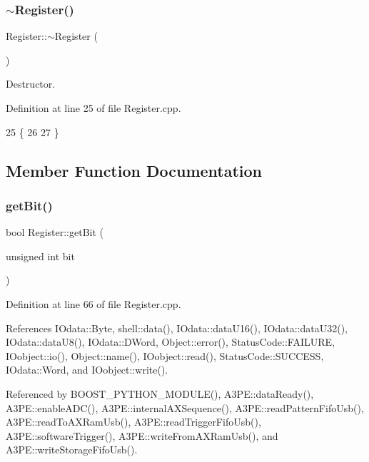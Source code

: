 \subsubsection{\texorpdfstring{$\sim$\+Register()}{~Register()}}
{\footnotesize\ttfamily Register\+::$\sim$\+Register (\begin{DoxyParamCaption}{ }\end{DoxyParamCaption})\hspace{0.3cm}{\ttfamily [virtual]}}



Destructor. 



Definition at line 25 of file Register.\+cpp.


\begin{DoxyCode}
25                     \{
26 
27 \}
\end{DoxyCode}


\subsection{Member Function Documentation}
\mbox{\label{classRegister_a5d27c9ff548817eee097ba4fdc8e8f69}} 
\subsubsection{\texorpdfstring{get\+Bit()}{getBit()}}
{\footnotesize\ttfamily bool Register\+::get\+Bit (\begin{DoxyParamCaption}\item[{unsigned int}]{bit }\end{DoxyParamCaption})}



Definition at line 66 of file Register.\+cpp.



References I\+Odata\+::\+Byte, shell\+::data(), I\+Odata\+::data\+U16(), I\+Odata\+::data\+U32(), I\+Odata\+::data\+U8(), I\+Odata\+::\+D\+Word, Object\+::error(), Status\+Code\+::\+F\+A\+I\+L\+U\+RE, I\+Oobject\+::io(), Object\+::name(), I\+Oobject\+::read(), Status\+Code\+::\+S\+U\+C\+C\+E\+SS, I\+Odata\+::\+Word, and I\+Oobject\+::write().



Referenced by B\+O\+O\+S\+T\+\_\+\+P\+Y\+T\+H\+O\+N\+\_\+\+M\+O\+D\+U\+L\+E(), A3\+P\+E\+::data\+Ready(), A3\+P\+E\+::enable\+A\+D\+C(), A3\+P\+E\+::internal\+A\+X\+Sequence(), A3\+P\+E\+::read\+Pattern\+Fifo\+Usb(), A3\+P\+E\+::read\+To\+A\+X\+Ram\+Usb(), A3\+P\+E\+::read\+Trigger\+Fifo\+Usb(), A3\+P\+E\+::software\+Trigger(), A3\+P\+E\+::write\+From\+A\+X\+Ram\+Usb(), and A3\+P\+E\+::write\+Storage\+Fifo\+Usb().


